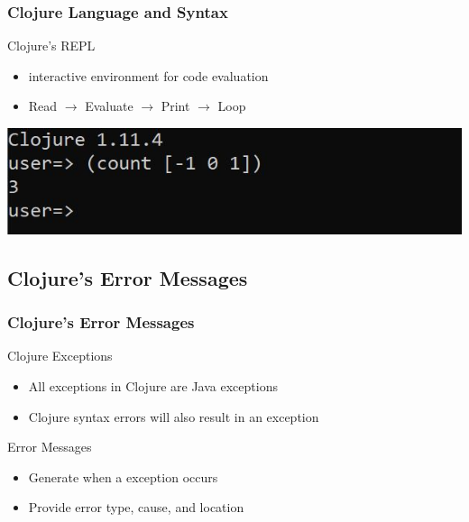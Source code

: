 \documentclass{beamer}
\newcommand{\comment}[1]{{\bf \tt  {#1}}}
\newcommand{\emcomment}[1]{\textcolor{ForestGreen}{\comment{Elena: {#1}}}}
\begin{document}

\begin{frame}
  \frametitle{Clojure Language and Syntax}
  Clojure's REPL
  \begin{itemize}
    \item interactive environment for code evaluation
    \item Read \(\rightarrow\) Evaluate \(\rightarrow\) Print \(\rightarrow\) Loop
  \end{itemize}
  \includegraphics{../resources/cljScreenshot.JPG}  
\end{frame}

\subsection{Clojure's Error Messages}
\begin{frame}
  \frametitle{Clojure's Error Messages}
  Clojure Exceptions
  \begin{itemize}
    \item All exceptions in Clojure are Java exceptions
    \item Clojure syntax errors will also result in an exception %
  \end{itemize}
  Error Messages
  \begin{itemize}
    \item Generate when a exception occurs
    \item Provide error type, cause, and location
  \end{itemize}
\end{frame}
\end{document}
